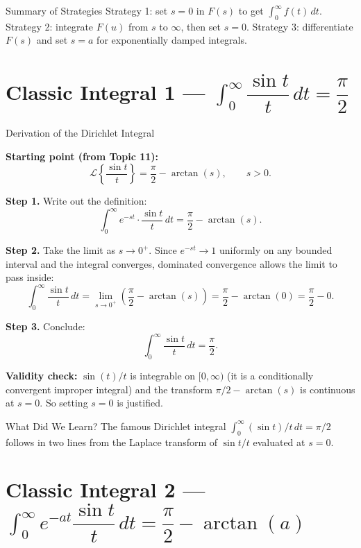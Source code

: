 \documentclass[12pt,a4paper]{article}
\begin{document}
\begin{learnbox}{Summary of Strategies}
Strategy 1: set $s = 0$ in $F(s)$ to get $\int_0^\infty f(t)\,dt$.
Strategy 2: integrate $F(u)$ from $s$ to $\infty$, then set $s = 0$.
Strategy 3: differentiate $F(s)$ and set $s = a$ for exponentially damped integrals.
\end{learnbox}

\section{Classic Integral 1 --- $\int_0^\infty \dfrac{\sin t}{t}\, dt = \dfrac{\pi}{2}$}

\begin{infobox}{Derivation of the Dirichlet Integral}

\textbf{Starting point (from Topic 11):}
\[
  \mathcal{L}\!\left\{\frac{\sin t}{t}\right\} = \frac{\pi}{2} - \arctan(s),
  \qquad s > 0.
\]

\textbf{Step 1.} Write out the definition:
\[
  \int_0^\infty e^{-st}\cdot\frac{\sin t}{t}\, dt = \frac{\pi}{2} - \arctan(s).
\]

\textbf{Step 2.} Take the limit as $s \to 0^+$. Since $e^{-st} \to 1$ uniformly on
any bounded interval and the integral converges, dominated convergence allows
the limit to pass inside:
\[
  \int_0^\infty \frac{\sin t}{t}\, dt
  = \lim_{s\to 0^+}\!\left(\frac{\pi}{2} - \arctan(s)\right)
  = \frac{\pi}{2} - \arctan(0)
  = \frac{\pi}{2} - 0.
\]

\textbf{Step 3.} Conclude:
\[
  \boxed{\int_0^\infty \frac{\sin t}{t}\, dt = \frac{\pi}{2}.}
\]

\textbf{Validity check:} $\sin(t)/t$ is integrable on $[0,\infty)$ (it is a
conditionally convergent improper integral) and the transform
$\pi/2 - \arctan(s)$ is continuous at $s = 0$. So setting $s = 0$ is justified.

\end{infobox}

\begin{learnbox}{What Did We Learn?}
The famous Dirichlet integral $\int_0^\infty (\sin t)/t\,dt = \pi/2$ follows
in two lines from the Laplace transform of $\sin t/t$ evaluated at $s = 0$.
\end{learnbox}

\section{Classic Integral 2 --- $\int_0^\infty e^{-at}\dfrac{\sin t}{t}\, dt
         = \dfrac{\pi}{2} - \arctan(a)$}
\end{document}
